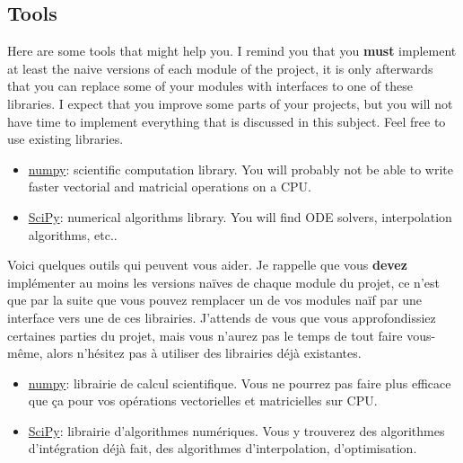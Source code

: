 \documentclass{article}
\begin{document}
\subsection{Tools}
\label{outils}

Here are some tools that might help you. I remind you that you \textbf{must} implement at least the naive versions of each module of the project, it is only afterwards that you can replace some of your modules with interfaces to one of these libraries. I expect that you improve some parts of your projects, but you will not have time to implement everything that is discussed in this subject. Feel free to use existing libraries.
\begin{itemize}
    \item \href{https://numpy.org/}{numpy}: scientific computation library. You will probably not be able to write faster vectorial and matricial operations on a CPU.
    \item \href{https://docs.scipy.org/doc/scipy/reference/}{SciPy}: numerical algorithms library. You will find ODE solvers, interpolation algorithms, etc..
\end{itemize}

Voici quelques outils qui peuvent vous aider. Je rappelle que vous \textbf{devez} implémenter au moins les versions naïves de chaque module du projet, ce n'est que par la suite que vous pouvez remplacer un de vos modules naïf par une interface vers une de ces librairies. J'attends de vous que vous approfondissiez certaines parties du projet, mais vous n'aurez pas le temps de tout faire vous-même, alors n'hésitez pas à utiliser des librairies déjà existantes.
\begin{itemize}
    \item \href{https://numpy.org/}{numpy}: librairie de calcul scientifique. Vous ne pourrez pas faire plus efficace que ça pour vos opérations vectorielles et matricielles sur CPU.
    \item \href{https://docs.scipy.org/doc/scipy/reference/}{SciPy}: librairie d'algorithmes numériques. Vous y trouverez des algorithmes d'intégration déjà fait, des algorithmes d'interpolation, d'optimisation.
\end{itemize}
\end{document}
